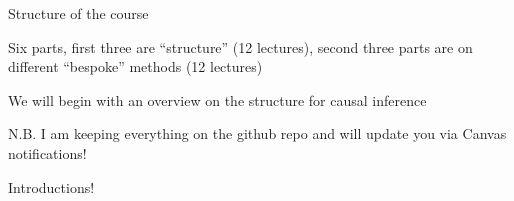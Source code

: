 \documentclass[notes,11pt, aspectratio=169]{beamer}
\newenvironment{wideitemize}{\itemize\addtolength{\itemsep}{10pt}}{\enditemize}
\begin{document}
\begin{frame}{Structure of the course}
  \begin{wideitemize}
  \item Six parts, first three are ``structure'' (12 lectures), second
    three parts are on different ``bespoke'' methods (12 lectures)
  \item We will begin with an overview on the structure for causal inference
  \item N.B. I am keeping everything on the github repo and will
    update you via Canvas notifications!
  \end{wideitemize}
\end{frame}


\begin{frame}{Introductions!}
\end{frame}
\end{document}
